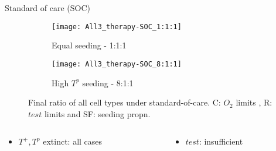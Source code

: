 \begin{frame}{Standard of care (SOC)}
  \begin{figure}[h]
    \centering
    \begin{subfigure}[b]{0.48\textwidth}
      \centering
      \texttt{[image: All3\_therapy-SOC\_1:1:1]}
      \caption{Equal seeding - 1:1:1}
    \end{subfigure}
    \begin{subfigure}[b]{0.48\textwidth}
      \centering
      \texttt{[image: All3\_therapy-SOC\_8:1:1]}
      \caption{High $T^p$ seeding - 8:1:1}
    \end{subfigure}
    \caption{Final ratio of all cell types under standard-of-care. C: $O_2$ limits , R: $test$ limits and SF: seeding propn. }
  \end{figure}
  \begin{columns}
    \begin{column}{0.5\textwidth}
      \begin{itemize}
        \item $T^+, T^p$ extinct: all cases
      \end{itemize}
    \end{column}
    \begin{column}{0.5\textwidth}
      \begin{itemize}
        \item $test$: insufficient
      \end{itemize}
    \end{column}
  \end{columns}
\end{frame}

